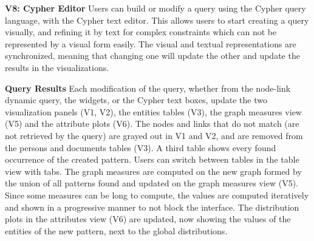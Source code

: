 

\noindent\textbf{V8: Cypher Editor}
Users can build or modify a query using the Cypher query language, with the Cypher text editor. This allows users to start creating a query visually, and refining it by text for complex constraints which can not be represented by a visual form easily. The visual and textual representations are synchronized, meaning that changing one will update the other and update the results in the visualizations.


\textbf{Query Results}
Each modification of the query, whether from the node-link dynamic query, the widgets, or the Cypher text boxes, update the two visualization panels (V1, V2), the entities tables (V3), the graph measures view (V5) and the attribute plots (V6).
The nodes and links that do not match (are not retrieved by the query) are grayed out in V1 and V2, and are removed from the persons and documents tables (V3). A third table shows every found occurrence of the created pattern. Users can switch between tables in the table view with tabs.
The graph measures are computed on the new graph formed by the union of all patterns found and updated on the graph measures view (V5). Since some measures can be long to compute, the values are computed iteratively and shown in a progressive manner \cite{fekete2019progressive} to not block the interface.
The distribution plots in the attributes view (V6) are updated, now showing the values of the entities of the new pattern, next to the global distributions.



